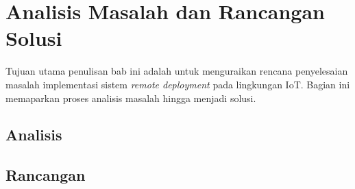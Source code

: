 \chapter{Analisis Masalah dan Rancangan Solusi}

Tujuan utama penulisan bab ini adalah untuk menguraikan rencana penyelesaian masalah implementasi sistem \textit{remote deployment} pada lingkungan IoT. Bagian ini memaparkan proses analisis masalah hingga menjadi solusi.


\section{Analisis}







\section{Rancangan}






